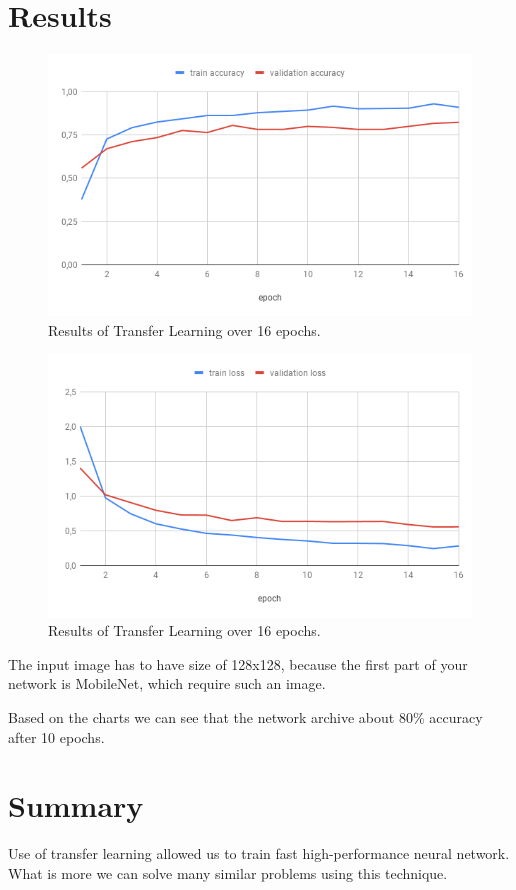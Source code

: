 	\section{Results}
			\begin{figure}[H]
				\centering
				\includegraphics[width = 12cm]{chart_accurcy.png}
				\caption{Results of Transfer Learning over 16 epochs.}		
			\end{figure}
			\begin{figure}[H]
				\centering
				\includegraphics[width = 12cm]{chart_loss.png}
				\caption{Results of Transfer Learning over 16 epochs.}		
			\end{figure}
			The input image has to have size of 128x128, because the first part of your network is MobileNet, which require such an image.
			
			Based on the charts we can see that the network archive about 80\% accuracy after 10 epochs.
	
	\section{Summary}
		Use of transfer learning allowed us to train fast high-performance neural network. What is more we can solve many similar problems using this technique.
